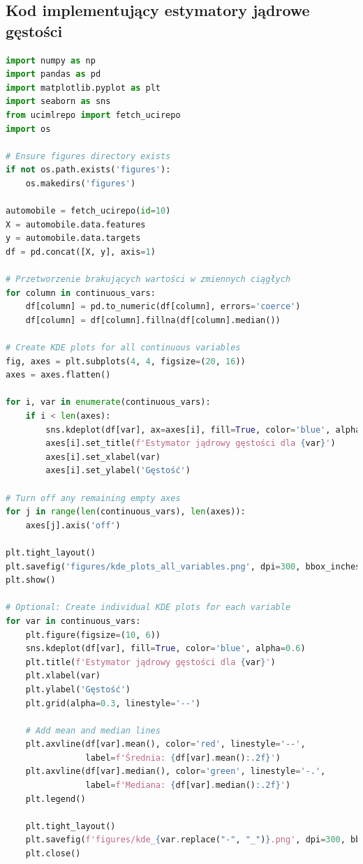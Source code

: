 \documentclass[12pt,a4paper]{article}
\begin{document}
\subsection{Kod implementujący estymatory jądrowe gęstości}
\begin{lstlisting}[language=Python, caption=Kod generujący estymatory jądrowe gęstości]
import numpy as np
import pandas as pd
import matplotlib.pyplot as plt
import seaborn as sns
from ucimlrepo import fetch_ucirepo
import os

# Ensure figures directory exists
if not os.path.exists('figures'):
    os.makedirs('figures')

automobile = fetch_ucirepo(id=10)
X = automobile.data.features
y = automobile.data.targets
df = pd.concat([X, y], axis=1)

# Przetworzenie brakujących wartości w zmiennych ciągłych
for column in continuous_vars:
    df[column] = pd.to_numeric(df[column], errors='coerce')
    df[column] = df[column].fillna(df[column].median())

# Create KDE plots for all continuous variables
fig, axes = plt.subplots(4, 4, figsize=(20, 16))
axes = axes.flatten()

for i, var in enumerate(continuous_vars):
    if i < len(axes):
        sns.kdeplot(df[var], ax=axes[i], fill=True, color='blue', alpha=0.6)
        axes[i].set_title(f'Estymator jądrowy gęstości dla {var}')
        axes[i].set_xlabel(var)
        axes[i].set_ylabel('Gęstość')

# Turn off any remaining empty axes
for j in range(len(continuous_vars), len(axes)):
    axes[j].axis('off')

plt.tight_layout()
plt.savefig('figures/kde_plots_all_variables.png', dpi=300, bbox_inches='tight')
plt.show()

# Optional: Create individual KDE plots for each variable 
for var in continuous_vars:
    plt.figure(figsize=(10, 6))
    sns.kdeplot(df[var], fill=True, color='blue', alpha=0.6)
    plt.title(f'Estymator jądrowy gęstości dla {var}')
    plt.xlabel(var)
    plt.ylabel('Gęstość')
    plt.grid(alpha=0.3, linestyle='--')
    
    # Add mean and median lines
    plt.axvline(df[var].mean(), color='red', linestyle='--', 
                label=f'Średnia: {df[var].mean():.2f}')
    plt.axvline(df[var].median(), color='green', linestyle='-.',
                label=f'Mediana: {df[var].median():.2f}')
    plt.legend()
    
    plt.tight_layout()
    plt.savefig(f'figures/kde_{var.replace("-", "_")}.png', dpi=300, bbox_inches='tight')
    plt.close()
\end{lstlisting}
\end{document}
